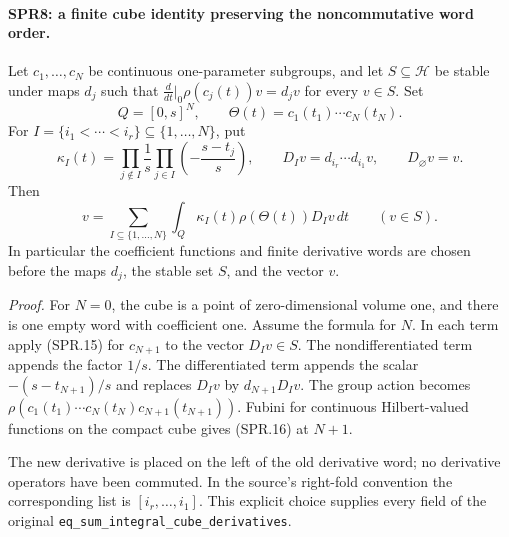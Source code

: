 \paragraph{SPR8: a finite cube identity preserving the noncommutative word order.}
\label{claim:SPR8}
Let \(c_1,\ldots,c_N\) be continuous one-parameter subgroups,
and let \(S\subseteq\mathcal H\) be stable under maps \(d_j\)
such that
\(\frac{d}{dt}|_0\rho(c_j(t))v=d_jv\) for every \(v\in S\).
Set
\[
 Q=[0,s]^N,\qquad
       \Theta(t)=c_1(t_1)\cdots c_N(t_N).
\]
For \(I=\{i_1<\cdots<i_r\}\subseteq\{1,\ldots,N\}\), put
\[
 \kappa_I(t)=
   \prod_{j\notin I}\frac1s
   \prod_{j\in I}\left(-\frac{s-t_j}{s}\right),
 \qquad D_Iv=d_{i_r}\cdots d_{i_1}v,\qquad D_\varnothing v=v.
\]
Then
\[
             v=\sum_{I\subseteq\{1,\ldots,N\}}
                  \int_Q\kappa_I(t)\rho(\Theta(t))D_Iv\,dt
                     \qquad(v\in S).
 \tag{SPR.16}
\]
In particular the coefficient functions and finite derivative
words are chosen before the maps \(d_j\), the stable set \(S\),
and the vector \(v\).

\emph{Proof.}
For \(N=0\), the cube is a point of zero-dimensional volume one,
and there is one empty word with coefficient one.
Assume the formula for \(N\).  In each term apply (SPR.15)
for \(c_{N+1}\) to the vector \(D_Iv\in S\).
The nondifferentiated term appends the factor \(1/s\).
The differentiated term appends the scalar
\(-(s-t_{N+1})/s\) and replaces \(D_Iv\) by
\(d_{N+1}D_Iv\).
The group action becomes
\(\rho(c_1(t_1)\cdots c_N(t_N)c_{N+1}(t_{N+1}))\).
Fubini for continuous Hilbert-valued functions on the compact cube
gives (SPR.16) at \(N+1\).

The new derivative is placed on the left of the old derivative
word; no derivative operators have been commuted.  In the source's
right-fold convention the corresponding list is
\([i_r,\ldots,i_1]\).
This explicit choice supplies every field of the original
\texttt{eq\_\allowbreak sum\_\allowbreak integral\_\allowbreak cube\_\allowbreak derivatives}.


